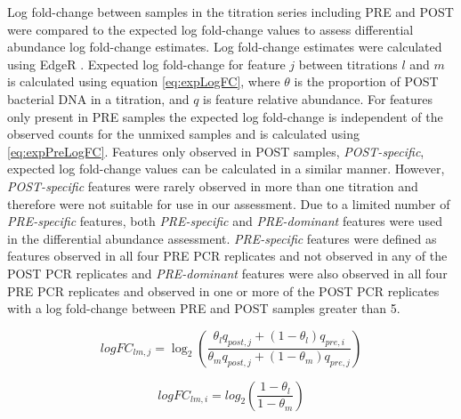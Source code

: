 \documentclass{bmcart}
\begin{document}
Log fold-change between samples in the titration series including PRE
and POST were compared to the expected log fold-change values to assess
differential abundance log fold-change estimates. Log fold-change
estimates were calculated using EdgeR
\cite{Robinson2010,McCarthy2012}. Expected log fold-change for
feature \(j\) between titrations \(l\) and \(m\) is calculated using
equation \eqref{eq:expLogFC}, where \(\theta\) is the proportion of POST
bacterial DNA in a titration, and \(q\) is feature relative abundance.
For features only present in PRE samples the expected log fold-change is
independent of the observed counts for the unmixed samples and is
calculated using \eqref{eq:expPreLogFC}. Features only observed in POST
samples, \emph{POST-specific}, expected log fold-change values can be
calculated in a similar manner. However, \emph{POST-specific} features
were rarely observed in more than one titration and therefore were not
suitable for use in our assessment. Due to a limited number of
\emph{PRE-specific} features, both \emph{PRE-specific} and
\emph{PRE-dominant} features were used in the differential abundance
assessment. \emph{PRE-specific} features were defined as features
observed in all four PRE PCR replicates and not observed in any of the
POST PCR replicates and \emph{PRE-dominant} features were also observed
in all four PRE PCR replicates and observed in one or more of the POST
PCR replicates with a log fold-change between PRE and POST samples
greater than 5.

\begin{equation}
      logFC_{lm,j} = \log_2\left(\frac{\theta_l q_{post,j} + (1 - \theta_l) q_{pre,i}}{\theta_m q_{post,j} + (1 - \theta_m) q_{pre,j}}\right)
  \label{eq:expLogFC}
\end{equation}

\begin{equation}
      logFC_{lm,i} = log_2\left(\frac{1-\theta_l}{1-\theta_m}\right)
  \label{eq:expPreLogFC}
\end{equation}

\end{document}
